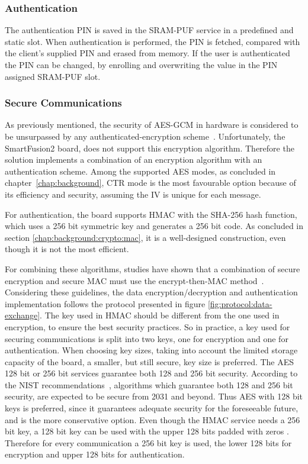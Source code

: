 \subsubsection*{Authentication}

The authentication PIN is saved in the SRAM-PUF service in a predefined and static slot. When authentication is performed, the PIN is fetched, compared with the client's supplied PIN and erased from memory.
If the user is authenticated the PIN can be changed, by enrolling and overwriting the value in the PIN assigned SRAM-PUF slot.

\subsubsection*{Secure Communications}

As previously mentioned, the security of \ac{AES}-\ac{GCM} in hardware is considered to be unsurpassed by any authenticated-encryption scheme~\cite{aesmodes}.
Unfortunately, the SmartFusion2 board, does not support this encryption algorithm.
Therefore the solution implements a combination of an encryption algorithm with an authentication scheme. Among the supported \ac{AES} modes, as concluded in chapter~\ref{chap:background}, CTR mode is the most favourable option because of its efficiency and security, assuming the IV is unique for each message.

For authentication, the board supports \ac{HMAC} with the \ac{SHA}-256 hash function, which uses a 256 bit symmetric key and generates a 256 bit code. As concluded in section \ref{chap:background:crypto:mac}, it is a well-designed construction, even though it is not the most efficient.

For combining these algorithms, studies have shown that a combination of secure encryption and secure \ac{MAC} must use the encrypt-then-MAC method~\cite{encryptmacorder}.
Considering these guidelines, the data encryption/decryption and authentication implementation follows the protocol presented in figure \ref{fig:protocol:data-exchange}.
The key used in HMAC should be different from the one used in encryption, to ensure the best security practices. So in practice, a key used for securing communications is split into two keys, one for encryption and one for authentication.
When choosing key sizes, taking into account the limited storage capacity of the board, a smaller, but still secure, key size is preferred. The \ac{AES} 128 bit or 256 bit services guarantee both 128 and 256 bit security. According to the \ac{NIST} recommendations~\cite{nistRecommendations}, algorithms which guarantee both 128 and 256 bit security, are expected to be secure from 2031 and beyond. Thus \ac{AES} with 128 bit keys is preferred, since it guarantees adequate security for the foreseeable future, and is the more conservative option.
Even though the HMAC service needs a 256 bit key, a 128 bit key can be used with the upper 128 bits padded with zeros \cite{smartfusionSecurityPractices}.
Therefore for every communication a 256 bit key is used, the lower 128 bits for encryption and upper 128 bits for authentication.

